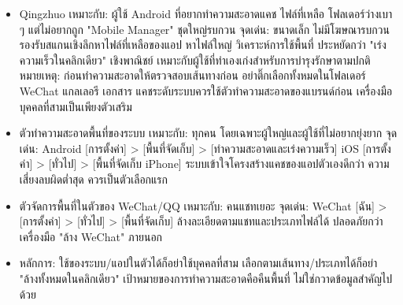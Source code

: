 \begin{itemize}
  \item Qingzhuo เหมาะกับ: ผู้ใช้ Android ที่อยากทำความสะอาดแคช ไฟล์ที่เหลือ โฟลเดอร์ว่างเบา ๆ แต่ไม่อยากถูก "Mobile Manager" ชุดใหญ่รบกวน จุดเด่น: ขนาดเล็ก ไม่มีโฆษณารบกวน รองรับสแกนเชิงลึกหาไฟล์ที่เหลือของแอป หาไฟล์ใหญ่ วิเคราะห์การใช้พื้นที่ ประหยัดกว่า "เร่งความเร็วในคลิกเดียว" เชิงพาณิชย์ เหมาะกับผู้ใช้ที่ทำเองเก่งสำหรับการบำรุงรักษาตามปกติ หมายเหตุ: ก่อนทำความสะอาดให้ตรวจสอบเส้นทางก่อน อย่าติ๊กเลือกทั้งหมดในโฟลเดอร์ WeChat แกลเลอรี เอกสาร แคชระดับระบบควรใช้ตัวทำความสะอาดของแบรนด์ก่อน เครื่องมือบุคคลที่สามเป็นเพียงตัวเสริม
  \item ตัวทำความสะอาดพื้นที่ของระบบ เหมาะกับ: ทุกคน โดยเฉพาะผู้ใหญ่และผู้ใช้ที่ไม่อยากยุ่งยาก จุดเด่น: Android [การตั้งค่า] > [พื้นที่จัดเก็บ] > [ทำความสะอาดและเร่งความเร็ว] iOS [การตั้งค่า] > [ทั่วไป] > [พื้นที่จัดเก็บ iPhone] ระบบเข้าใจโครงสร้างแคชของแอปตัวเองดีกว่า ความเสี่ยงลบผิดต่ำสุด ควรเป็นตัวเลือกแรก
  \item ตัวจัดการพื้นที่ในตัวของ WeChat/QQ เหมาะกับ: คนแชทเยอะ จุดเด่น: WeChat [ฉัน] > [การตั้งค่า] > [ทั่วไป] > [พื้นที่จัดเก็บ] ล้างละเอียดตามแชทและประเภทไฟล์ได้ ปลอดภัยกว่าเครื่องมือ "ล้าง WeChat" ภายนอก
  \item หลักการ: ใช้ของระบบ/แอปในตัวได้ก็อย่าใช้บุคคลที่สาม เลือกตามเส้นทาง/ประเภทได้ก็อย่า "ล้างทั้งหมดในคลิกเดียว" เป้าหมายของการทำความสะอาดคือคืนพื้นที่ ไม่ใช่กวาดข้อมูลสำคัญไปด้วย
\end{itemize}


